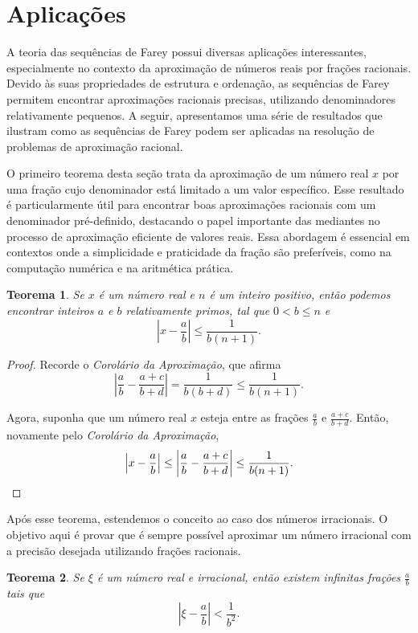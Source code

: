 \documentclass{hipatia}
\newtheorem*{theorem*}{Teorema}
\theoremstyle{definition} %
\begin{document}
\section{Aplicações}

A teoria das sequências de Farey possui diversas aplicações interessantes, especialmente no contexto da aproximação de números reais por frações racionais. Devido às suas propriedades de estrutura e ordenação, as sequências de Farey permitem encontrar aproximações racionais precisas, utilizando denominadores relativamente pequenos. A seguir, apresentamos uma série de resultados que ilustram como as sequências de Farey podem ser aplicadas na resolução de problemas de aproximação racional.

O primeiro teorema desta seção trata da aproximação de um número real $x$ por uma fração cujo denominador está limitado a um valor específico. Esse resultado é particularmente útil para encontrar boas aproximações racionais com um denominador pré-definido, destacando o papel importante das mediantes no processo de aproximação eficiente de valores reais. Essa abordagem é essencial em contextos onde a simplicidade e praticidade da fração são preferíveis, como na computação numérica e na aritmética prática.


\begin{theorem*}
Se \(x\) é um número real e \(n\) é um inteiro positivo, então podemos encontrar inteiros \(a\) e \(b\) relativamente primos, tal que \(0 < b \leq n\) e
\[
\left| x - \frac{a}{b} \right| \leq \frac{1}{b(n + 1)}.
\]
\end{theorem*}

\begin{proof}
Recorde o \textit{Corolário da Aproximação}, que afirma
\[
\left| \frac{a}{b} - \frac{a + c}{b + d} \right| = \frac{1}{b(b + d)} \leq \frac{1}{b(n + 1)}.
\]

Agora, suponha que um número real \(x\) esteja entre as frações \(\frac{a}{b}\) e \(\frac{a + c}{b + d}\). Então, novamente pelo \textit{Corolário da Aproximação},
\[
\left| x - \frac{a}{b} \right| \leq \left| \frac{a}{b} - \frac{a + c}{b + d} \right| \leq \frac{1}{b(n + 1)}.\qedhere
\]
\end{proof}

Após esse teorema, estendemos o conceito ao caso dos números irracionais. O objetivo aqui é provar que é sempre possível aproximar um número irracional com a precisão desejada utilizando frações racionais. 


\begin{theorem*}
Se \( \xi \) é um número real e irracional, então existem infinitas frações \( \frac{a}{b} \) tais que
\[
\left| \xi - \frac{a}{b} \right| < \frac{1}{b^2}.
\]
\end{theorem*}
\end{document}
